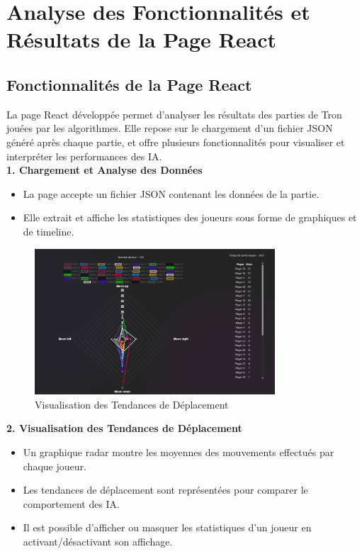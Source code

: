 \section{Analyse des Fonctionnalités et Résultats de la Page React}

\subsection{Fonctionnalités de la Page React}
La page React développée permet d'analyser les résultats des parties de Tron jouées par les algorithmes. Elle repose sur le chargement d'un fichier JSON généré après chaque partie, et offre plusieurs fonctionnalités pour visualiser et interpréter les performances des IA. \\
\textbf{1. Chargement et Analyse des Données}
\begin{itemize}
    \item La page accepte un fichier JSON contenant les données de la partie.
    \item Elle extrait et affiche les statistiques des joueurs sous forme de graphiques et de timeline.
\end{itemize}

\begin{figure}[h]
	\centering
	\includegraphics[width=0.8\textwidth]{images/TendanceDeplacement.png}
	\caption{Visualisation des Tendances de Déplacement}
	\label{TendanceDeplacement}
\end{figure}
\textbf{2. Visualisation des Tendances de Déplacement}
\begin{itemize}
    \item Un graphique radar montre les moyennes des mouvements effectués par chaque joueur.
    \item Les tendances de déplacement sont représentées pour comparer le comportement des IA.
    \item Il est possible d'afficher ou masquer les statistiques d'un joueur en activant/désactivant son affichage.
\end{itemize}

